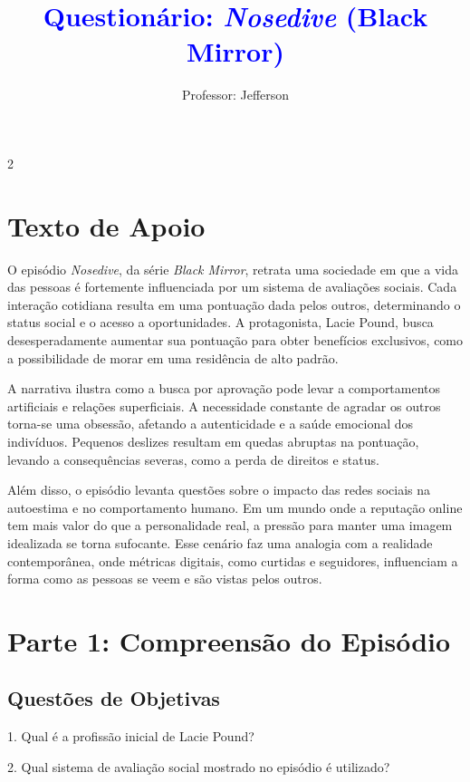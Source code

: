 \documentclass[11pt]{article}
\title{\textcolor{blue}{Questionário: \textit{Nosedive} (Black Mirror)}}
\author{Professor: Jefferson}
\date{}
\begin{document}
\maketitle
\vspace{-1cm}

\begin{multicols}{2}

\section*{Texto de Apoio}

O episódio \textit{Nosedive}, da série \textit{Black Mirror}, retrata uma sociedade em que a vida das pessoas é fortemente influenciada por um sistema de avaliações sociais. Cada interação cotidiana resulta em uma pontuação dada pelos outros, determinando o status social e o acesso a oportunidades. A protagonista, Lacie Pound, busca desesperadamente aumentar sua pontuação para obter benefícios exclusivos, como a possibilidade de morar em uma residência de alto padrão.

A narrativa ilustra como a busca por aprovação pode levar a comportamentos artificiais e relações superficiais. A necessidade constante de agradar os outros torna-se uma obsessão, afetando a autenticidade e a saúde emocional dos indivíduos. Pequenos deslizes resultam em quedas abruptas na pontuação, levando a consequências severas, como a perda de direitos e status.

Além disso, o episódio levanta questões sobre o impacto das redes sociais na autoestima e no comportamento humano. Em um mundo onde a reputação online tem mais valor do que a personalidade real, a pressão para manter uma imagem idealizada se torna sufocante. Esse cenário faz uma analogia com a realidade contemporânea, onde métricas digitais, como curtidas e seguidores, influenciam a forma como as pessoas se veem e são vistas pelos outros.

\section*{Parte 1: Compreensão do Episódio}
\subsection*{Questões de Objetivas}

\hspace{0.6cm}1. Qual é a profissão inicial de Lacie Pound?  

2. Qual sistema de avaliação social mostrado no episódio é utilizado?  


\end{multicols}
\end{document}
